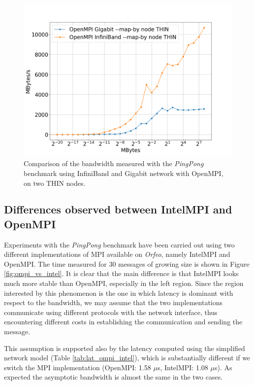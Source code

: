\documentclass{article}
\begin{document}
\begin{figure}[t]
    \centering
    \includegraphics[width=\textwidth]{benchmark/infi_vs_giga_node_bandw.png}
    \caption{Comparison of the bandwidth measured with the \emph{PingPong} benchmark using InfiniBand and Gigabit network with OpenMPI, on two THIN nodes.}
    \label{fig:infi_vs_giga_bandwidth}
\end{figure}

\subsection{Differences observed between IntelMPI and OpenMPI}
Experiments with the \emph{PingPong} benchmark have been carried out using two different implementations of MPI available on \emph{Orfeo}, namely IntelMPI and OpenMPI. The time measured for 30 messages of growing size is shown in Figure \ref{fig:ompi_vs_intel}. It is clear that the main difference is that IntelMPI looks much more stable than OpenMPI, especially in the left region. Since the region interested by this phenomenon is the one in which latency is dominant with respect to the bandwidth, we may assume that the two implementations communicate using different protocols with the network interface, thus encountering different costs in establishing the communication and sending the message.

This assumption is supported also by the latency computed using the simplified network model (Table \ref{tab:lat_ompi_intel}), which is substantially different if we switch the MPI implementation (OpenMPI: 1.58 $\mu$s, IntelMPI: 1.08 $\mu$s). As expected the asymptotic bandwidth is almost the same in the two cases.
\end{document}
